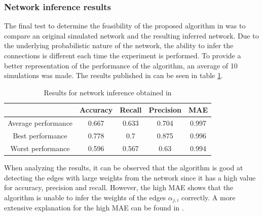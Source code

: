 \documentclass[11pt]{article}
\begin{document}
\subsubsection{Network inference results}

The final test to determine the feasibility of the proposed algorithm in \cite{alexandru2018estimating} was to compare an original simulated network and the resulting inferred network. Due to the underlying probabilistic nature of the network, the ability to infer the connections is different each time the experiment is performed. To provide a better representation of the performance of the algorithm, an average of 10 simulations was made. The results published in \cite{alexandru2018estimating} can be seen in table \ref{tab:results_pranav}.

\begin{table}
    \centering
    \begin{tabular}{|c|c|c|c|c|}
		\hline
		& Accuracy & Recall & Precision & MAE \\
		\hline
		Average performance & 0.667 & 0.633 & 0.704 & 0.997 \\
		\hline
		Best performance & 0.778 & 0.7 & 0.875 & 0.996  \\
		\hline
		Worst performance & 0.596 & 0.567 & 0.63 & 0.994 \\
		\hline
		\end{tabular}
		\caption{Results for network inference obtained in \cite{alexandru2018estimating}}
		\label{tab:results_pranav}
\end{table}

When analyzing the results, it can be observed that the algorithm is good at detecting the edges with large weights from the network since it has a high value for accuracy, precision and recall. However, the high MAE shows that the algorithm is unable to infer the weights of the edges $\alpha_{j,i}$ correctly. A more extensive explanation for the high MAE can be found in \cite{pranav_report}.


\newpage
\printbibliography 
\end{document}
